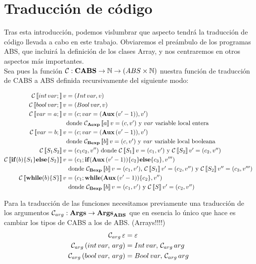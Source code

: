 \section{Traducción de código}

Tras esta introducción, podemos vislumbrar que aspecto tendrá la traducción de código llevada a cabo en este trabajo. Obviaremos el preámbulo de los programas ABS, que incluirá la definición de los clases Array, y nos centraremos en otros aspectos más importantes.\\

Sea pues la función $\C: \CABS \rightarrow \Nat \rightarrow (ABS \times \Nat)$ nuestra función de traducción de CABS a ABS definida recursivamente del siguiente modo:

\begin{align*}
  \C\eval{int\, var\;} v &= (Int\, var, v) \\
  \C\eval{bool\, var\;} v &= (Bool\, var, v) \\
  \C\eval{var = a\;} v &= (c\; var = (\Aux\, (v' - 1)), v') \\
  & \mbox{donde $\C_\AExp\eval{a} v = (c, v')$ y $var$ variable local entera} \\
  \C\eval{var = b\;} v &= (c\; var = (\Aux\, (v' - 1)), v') \\
  & \mbox{donde $\C_\BExp\eval{b} v = (c, v')$ y $var$ variable local booleana} \\
  \C\eval{S_1 S_2} v &= (c_1 c_2, v'') \mbox{ donde $\C\eval{S_1} v = (c_1, v')$ y $\C\eval{S_2} v' = (c_2, v'')$} \\
  \C\eval{\If{b}{S_1}{S_2}} v &= (c_1\; \If{\Aux\, (v' - 1)}{c_2}{c_3}, v''') \\
  & \mbox{ donde $\C_\BExp\eval{b} v = (c_1, v')$, $\C\eval{S_1} v' = (c_2, v'')$ y $\C\eval{S_2} v'' = (c_3, v''')$} \\
  \C\eval{\while{b}{S}} v &= (c_1\; \while{\Aux\, (v' - 1)}{c_2}, v'') \\
  & \mbox{ donde $\C_\BExp\eval{b} v = (c_1, v')$ y $\C\eval{S} v' = (c_2, v'')$}
\end{align*}

Para la traducción de las funciones necesitamos previamente una traducción de los argumentos $\C_{arg}: \Args \rightarrow \Args_\ABS$ que en esencia lo único que hace es cambiar los tipos de CABS a los de ABS. (Arrays!!!!)
\begin{align*}
  \C_{arg}\,\varepsilon &= \varepsilon\\
  \C_{arg}\, (int \, var,\,arg) &= Int\,var,\,\C_{arg}\, arg\\
  \C_{arg}\, (bool \, var,\,arg) &= Bool\,var,\,\C_{arg}\, arg
\end{align*}

